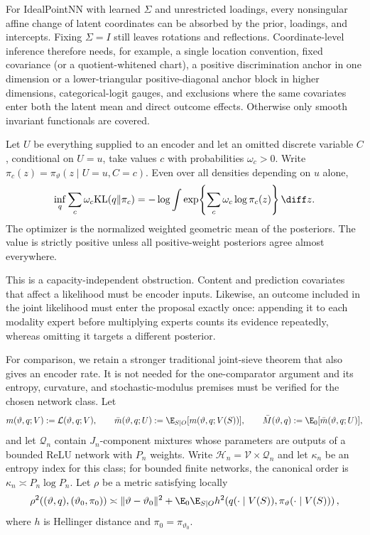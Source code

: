 For IdealPointNN with learned $\Sigma$ and unrestricted loadings, every
nonsingular affine change of latent coordinates can be absorbed by the prior,
loadings, and intercepts.  Fixing $\Sigma=I$ still leaves rotations and
reflections.  Coordinate-level inference therefore needs, for example, a
single location convention, fixed covariance (or a quotient-whitened chart),
a positive discrimination anchor in one dimension or a lower-triangular
positive-diagonal anchor block in higher dimensions, categorical-logit gauges,
and exclusions where the same covariates enter both the latent mean and direct
outcome effects.  Otherwise only smooth invariant functionals are covered.

\begin{proposition}
\label{prop:omitted_conditioning_gap}
Let $U$ be everything supplied to an encoder and let an omitted discrete
variable $C$, conditional on $U=u$, take values $c$ with probabilities
$\omega_c>0$.  Write
$\pi_c(z)=\pi_\vartheta(z\mid U=u,C=c)$.  Even over all densities depending
on $u$ alone,
\begin{equation}
 \inf_q\sum_c\omega_c\mathrm{KL}(q\|\pi_c)
 =-\log\int\exp\!\left\{\sum_c\omega_c\log\pi_c(z)\right\}\diff z.
 \label{eq:omitted_conditioning_gap}
\end{equation}
The optimizer is the normalized weighted geometric mean of the posteriors.
The value is strictly positive unless all positive-weight posteriors agree
almost everywhere.
\end{proposition}

This is a capacity-independent obstruction.  Content and prediction
covariates that affect a likelihood must be encoder inputs.  Likewise, an
outcome included in the joint likelihood must enter the proposal exactly
once: appending it to each modality expert before multiplying experts counts
its evidence repeatedly, whereas omitting it targets a different posterior.

For comparison, we retain a stronger traditional joint-sieve theorem that
also gives an encoder rate.  It is not needed for the one-comparator argument
and its entropy, curvature, and stochastic-modulus premises must be verified
for the chosen network class.  Let
\[
 m(\vartheta,q;V):=\mathcal L(\vartheta,q;V),\qquad
 \bar m(\vartheta,q;U):=\E_{S\mid O}[m(\vartheta,q;V(S))],
 \qquad
 \bar M(\vartheta,q):=\E_0[\bar m(\vartheta,q;U)],
\]
and let $\mathcal Q_n$ contain $J_n$-component mixtures whose parameters are
outputs of a bounded ReLU network with $P_n$ weights.  Write
$\mathcal H_n=\mathcal V\times\mathcal Q_n$ and let $\kappa_n$ be an entropy
index for this class; for bounded finite networks, the canonical order is
$\kappa_n\asymp P_n\log P_n$.  Let $\rho$ be a metric satisfying locally
\begin{equation}
 \rho^2((\vartheta,q),(\vartheta_0,\pi_0))
 \asymp \|\vartheta-\vartheta_0\|^2
 +\E_0\E_{S\mid O} h^2\!\left(q(\cdot\mid V(S)),
 \pi_\vartheta(\cdot\mid V(S))\right),
 \label{eq:sieve_metric}
\end{equation}
where $h$ is Hellinger distance and
$\pi_0=\pi_{\vartheta_0}$.

